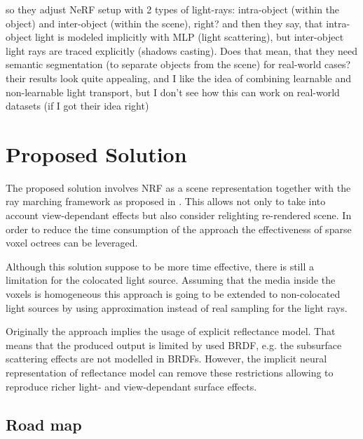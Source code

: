 \documentclass[english]{article}
\newcommand{\rphr}[1]{{\color{blue}#1}}
\begin{document}
\rphr{\cite{guo2020osf} so they adjust NeRF setup with 2 types of light-rays: intra-object (within the object) and inter-object (within the scene), right? and then they say, that intra-object light is modeled implicitly with MLP (light scattering), but inter-object light rays are traced explicitly (shadows casting). Does that mean, that they need semantic segmentation (to separate objects from the scene) for real-world cases? their results look quite appealing, and I like the idea of combining learnable and non-learnable light transport, but I don't see how this can work on real-world datasets (if I got their idea right)}



\section{Proposed Solution}

The proposed solution involves NRF as a scene representation together with the ray marching framework as proposed in \cite{nrf2020}. This allows not only to take into account view-dependant effects but also consider relighting re-rendered scene. In order to reduce the time consumption of the approach the effectiveness of sparse voxel octrees \cite{nsvf2020} can be leveraged.

Although this solution suppose to be more time effective, there is still a limitation for the colocated light source. Assuming that the media inside the voxels is homogeneous this approach is going to be extended to non-colocated light sources by using approximation instead of real sampling for the light rays.

Originally the approach implies the usage of explicit reflectance model.
That means that the produced output is limited by used BRDF, e.g. the subsurface scattering effects are not modelled in BRDFs.
However, the implicit neural representation of reflectance model can remove these restrictions allowing to reproduce richer light- and view-dependant surface effects.


\subsection{Road map}
\label{roadmap}
\end{document}
